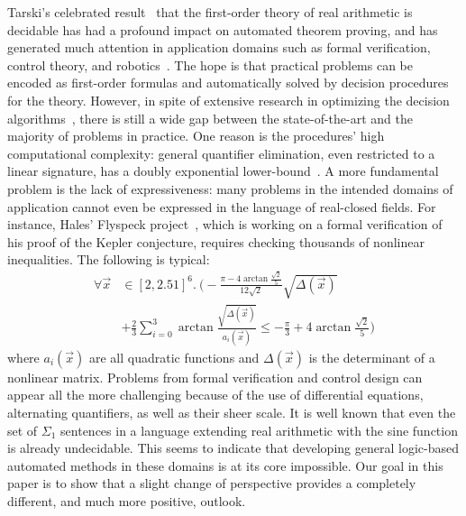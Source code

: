 \documentclass[conference]{IEEEtran}
\begin{document}
Tarski's celebrated result~\cite{tarski} that the first-order theory of real arithmetic is decidable has had a profound impact on automated theorem proving, and has generated much attention in application domains such as formal verification, control theory, and robotics~\cite{qeappl}. The hope is that practical problems can be encoded as first-order formulas and automatically solved by decision procedures for the theory. However, in spite of extensive research in optimizing the decision algorithms~\cite{collins}, there is still a wide gap between the state-of-the-art and the majority of problems in practice. One reason is the procedures' high computational complexity: general quantifier elimination, even restricted to a linear signature, has a doubly exponential lower-bound~\cite{BrownD07}. A more fundamental problem is the lack of expressiveness: many problems in the intended domains of application cannot even be expressed in the language of real-closed fields. For instance, Hales' Flyspeck project~\cite{DBLP:conf/dagstuhl/Hales05,DBLP:journals/dcg/HalesHMNOZ10}, which is working on a formal verification of his proof of the Kepler conjecture, requires checking thousands of nonlinear inequalities. The following is typical:
\begin{align*}
\forall \vec x&\in [2, 2.51]^6.\ \Big( -\frac{\pi-4\arctan\frac{\sqrt 2}{5}}{12\sqrt2}\sqrt{\Delta(\vec x)}\\
&+\frac{2}{3}\sum_{i=0}^3\arctan\frac{\sqrt{\Delta(\vec x)}}{a_i(\vec x)}\leq -\frac{\pi}{3}+4\arctan\frac{\sqrt 2}{5}\Big)
\end{align*}
where $a_i(\vec x)$ are all quadratic functions and $\Delta(\vec x)$ is the determinant of a nonlinear matrix. Problems from formal verification and control design can appear all the more challenging because of the use of differential equations, alternating quantifiers, as well as their sheer scale. It is well known that even the set of $\Sigma_1$ sentences in a language extending real arithmetic with the sine function is already undecidable. This seems to indicate that developing general logic-based automated methods in these domains is at its core impossible. Our goal in this paper is to show that a slight change of perspective provides a completely different, and much more positive, outlook.
\end{document}
